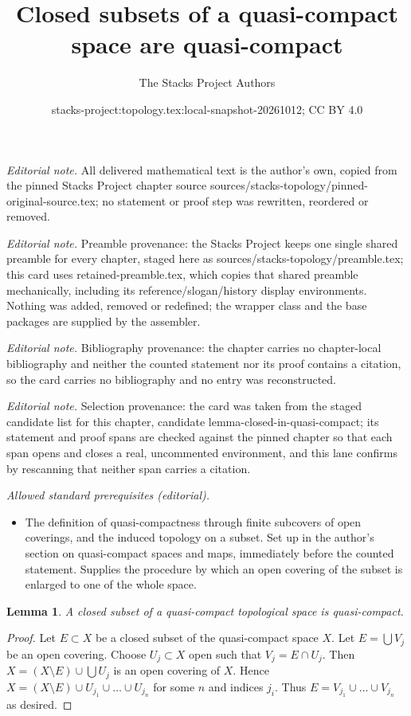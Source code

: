 \documentclass[10pt,a4paper]{amsart}
\title{Closed subsets of a quasi-compact space are quasi-compact}
\author{The Stacks Project Authors}
\date{stacks-project:topology.tex:local-snapshot-20261012; CC BY 4.0}
\theoremstyle{plain}
\newtheorem{lemma}[subsection]{Lemma}
\theoremstyle{definition}
\theoremstyle{remark}
\numberwithin{equation}{subsection}
\begin{document}
\maketitle
\noindent\textit{Editorial note.} All delivered mathematical text is the author's own, copied from the pinned Stacks Project chapter source sources/stacks-topology/pinned-original-source.tex; no statement or proof step was rewritten, reordered or removed.\par\medskip
\noindent\textit{Editorial note.} Preamble provenance: the Stacks Project keeps one single shared preamble for every chapter, staged here as sources/stacks-topology/preamble.tex; this card uses retained-preamble.tex, which copies that shared preamble mechanically, including its reference/slogan/history display environments. Nothing was added, removed or redefined; the wrapper class and the base packages are supplied by the assembler.\par\medskip
\noindent\textit{Editorial note.} Bibliography provenance: the chapter carries no chapter-local bibliography and neither the counted statement nor its proof contains a citation, so the card carries no bibliography and no entry was reconstructed.\par\medskip
\noindent\textit{Editorial note.} Selection provenance: the card was taken from the staged candidate list for this chapter, candidate lemma-closed-in-quasi-compact; its statement and proof spans are checked against the pinned chapter so that each span opens and closes a real, uncommented environment, and this lane confirms by rescanning that neither span carries a citation.\par\medskip
\noindent\textit{Allowed standard prerequisites (editorial).}\begin{itemize}
\item The definition of quasi-compactness through finite subcovers of open coverings, and the induced topology on a subset. Set up in the author's section on quasi-compact spaces and maps, immediately before the counted statement. Supplies the procedure by which an open covering of the subset is enlarged to one of the whole space.
\end{itemize}\medskip
\begin{lemma}
\label{lemma-closed-in-quasi-compact}
A closed subset of a quasi-compact topological space is quasi-compact.
\end{lemma}

\begin{proof}
Let $E \subset X$ be a closed subset of the quasi-compact space $X$.
Let $E = \bigcup V_j$ be an open covering. Choose $U_j \subset X$
open such that $V_j = E \cap U_j$. Then $X = (X \setminus E) \cup \bigcup U_j$
is an open covering of $X$. Hence
$X = (X \setminus E) \cup U_{j_1} \cup \ldots \cup U_{j_n}$ for some
$n$ and indices $j_i$. Thus $E = V_{j_1} \cup \ldots \cup V_{j_n}$
as desired.
\end{proof}
\end{document}
